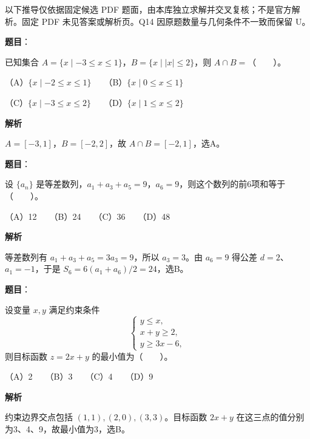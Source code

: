 

\begin{gktip}
以下推导仅依据固定候选 PDF 题面，由本库独立求解并交叉复核；不是官方解析。固定 PDF 未见答案或解析页。Q14 因原题数量与几何条件不一致而保留 U。
\end{gktip}

\begin{answer}

\textbf{题目}：

已知集合 $A=\{x\mid -3\le x\le 1\}$，$B=\{x\mid |x|\le 2\}$，则 $A\cap B=$\mbox{（　　）}。

（A）$\{x\mid -2\le x\le 1\}$　　（B）$\{x\mid 0\le x\le 1\}$

（C）$\{x\mid -3\le x\le 2\}$　　（D）$\{x\mid 1\le x\le 2\}$

\textbf{解析}

$A=[-3,1]$，$B=[-2,2]$，故 $A\cap B=[-2,1]$，选A。


\end{answer}
\begin{answer}

\textbf{题目}：

设 $\{a_n\}$ 是等差数列，$a_1+a_3+a_5=9$，$a_6=9$，则这个数列的前6项和等于\mbox{（　　）}。

（A）12　　（B）24　　（C）36　　（D）48

\textbf{解析}

等差数列有 $a_1+a_3+a_5=3a_3=9$，所以 $a_3=3$。由 $a_6=9$ 得公差 $d=2$、$a_1=-1$，于是 $S_6=6(a_1+a_6)/2=24$，选B。


\end{answer}
\begin{answer}

\textbf{题目}：

设变量 $x,y$ 满足约束条件
\nopagebreak[4]
\[
\begin{cases}y\le x,\\x+y\ge 2,\\y\ge 3x-6,\end{cases}
\]
则目标函数 $z=2x+y$ 的最小值为\mbox{（　　）}。

（A）2　　（B）3　　（C）4　　（D）9

\textbf{解析}

约束边界交点包括 $(1,1),(2,0),(3,3)$。目标函数 $2x+y$ 在这三点的值分别为3、4、9，故最小值为3，选B。


\end{answer}

